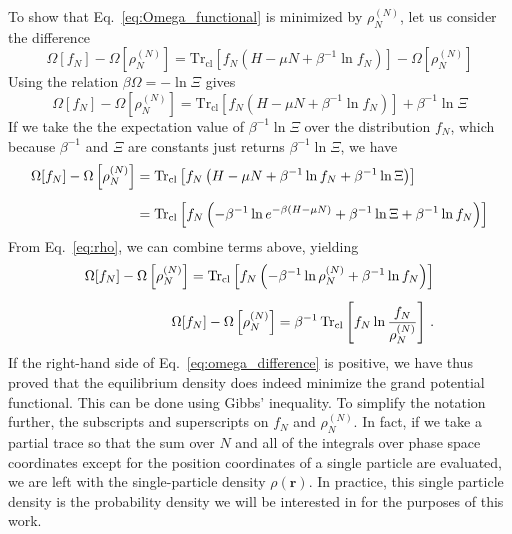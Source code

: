 \documentclass{report}
\newcommand{\trace}{\operatorname{Tr_{cl}}}
\begin{document}
To show that Eq.~\ref{eq:Omega_functional} is minimized by \(\rho_N^{(N)}\), let us consider the difference
\begin{equation}
    \Omega[f_N] - \Omega\left[\rho_N^{(N)}\right] = \trace \left[f_N\left(H-\mu N + \beta^{-1}\ln f_N\right)\right] - \Omega\left[\rho_N^{(N)}\right]
\end{equation}
Using the relation \(\beta\Omega = -\ln\Xi\) gives
\begin{equation}
    \Omega[f_N] - \Omega\left[\rho_N^{(N)}\right] = \trace \left[f_N\left(H-\mu N + \beta^{-1}\ln f_N\right)\right] + \beta^{-1}\ln\Xi
\end{equation}
If we take the the expectation value of \(\beta^{-1}\ln\Xi \) over the distribution \(f_N \), which because \(\beta^{-1} \) and \( \Xi \) are constants just returns \(\beta^{-1}\ln\Xi \), we have
\begin{equation*}
    \setlength{\jot}{8pt}
    \begin{split}
    \Omega[f_N] - \Omega\left[\rho_N^{(N)}\right] &= \trace \left[f_N\left(H-\mu N + \beta^{-1}\ln f_N + \beta^{-1}\ln\Xi\right)\right] \\
    &= \trace \left[f_N\left(-\beta^{-1}\ln e^{-\beta(H-\mu N)} + \beta^{-1}\ln\Xi + \beta^{-1}\ln f_N \right)\right]
    \end{split}
\end{equation*}
From Eq.~\ref{eq:rho}, we can combine terms above, yielding
\begin{equation}
    \setlength{\jot}{8pt}
    \begin{split}
    \Omega[f_N] - \Omega\left[\rho_N^{(N)}\right] = \trace \left[f_N\left(-\beta^{-1}\ln \rho_N^{(N)} + \beta^{-1}\ln f_N \right)\right] \\
    \Omega[f_N] - \Omega\left[\rho_N^{(N)}\right] = \beta^{-1}\trace \left[f_N\ln \frac{f_N}{\rho_N^{(N)}}\right] \, .
    \end{split}
    \label{eq:omega_difference}
\end{equation}
If the right-hand side of Eq.~\ref{eq:omega_difference} is positive, we have thus proved that the equilibrium density does indeed minimize the grand potential functional. This can be done using Gibbs' inequality. To simplify the notation further, the subscripts and superscripts on $f_N$ and \(\rho_N^{(N)}\). In fact, if we take a partial trace so that the sum over $N$ and all of the integrals over phase space coordinates except for the position coordinates of a single particle are evaluated, we are left with the single-particle density \(\rho(\mathbf{r})\). In practice, this single particle density is the probability density we will be interested in for the purposes of this work.
\end{document}
